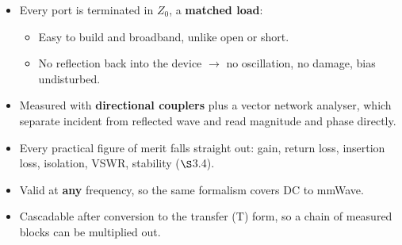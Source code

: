 {\begin{itemize}
\begin{itemize}
  \end{itemize}
  \item Every port is terminated in $Z_0$, a \textbf{matched load}:
  \begin{itemize}
    \item Easy to build and broadband, unlike open or short.
    \item No reflection back into the device $\rightarrow$ no oscillation, no damage,
      bias undisturbed.
  \end{itemize}
  \item Measured with \textbf{directional couplers} plus a vector network analyser, which
    separate incident from reflected wave and read magnitude and phase directly.
  \item Every practical figure of merit falls straight out: gain, return loss, insertion
    loss, isolation, VSWR, stability ($\S$3.4).
  \item Valid at \textbf{any} frequency, so the same formalism covers DC to mmWave.
  \item Cascadable after conversion to the transfer (T) form, so a chain of measured
    blocks can be multiplied out.
\end{itemize}}

